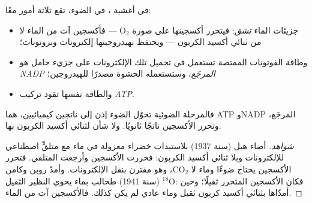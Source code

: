 \begin{proposition}\label{prop:g12:photosynthesis:lightphase}
في أغشية ، في الضوء، تقع ثلاثة أمور معًا:
\begin{itemize}
  \item جزيئات الماء \emph{تشق}: فيتحرر أكسجينها على صورة
        $\mathrm{O_2}$ --- فأكسجين  آت من الماء لا من
        ثنائي أكسيد الكربون --- ويحتفظ بهيدروجينها إلكترونات
        وبروتونات؛
  \item وطاقة الفوتونات الممتصة تستعمل في تحميل تلك الإلكترونات على
        جزيء حامل هو \emph{NADP المرجَع}، وستستعمله الحشوة مصدرًا
        للهيدروجين؛
  \item والطاقة نفسها تقود تركيب \emph{ATP}.
\end{itemize}
فالمرحلة الضوئية تحوّل الضوء إذن إلى ناتجين كيميائيين، هما ATP وNADP
المرجَع، وتحرر الأكسجين ناتجًا ثانويًا. ولا شأن لثنائي أكسيد الكربون
بها.
\end{proposition}
\begin{proof}[شواهد]
أضاء هيل (سنة 1937) بلاستيدات خضراء معزولة في ماء مع متلقٍّ اصطناعي
للإلكترونات وبلا ثنائي أكسيد الكربون: فحررت الأكسجين وأرجعت المتلقي.
فتحرر الأكسجين يحتاج ضوءًا وماء لا $\mathrm{CO_2}$، وهو مقترن بنقل
الإلكترونات. وأمدّ روبن وكامن (سنة 1941) طحالب بماء يحوي النظير الثقيل
$^{18}$O: فكان الأكسجين المتحرر ثقيلًا؛ وحين أمدّاها بثنائي أكسيد
كربون ثقيل وماء عادي لم يكن كذلك. فالأكسجين آت من الماء.
\end{proof}

